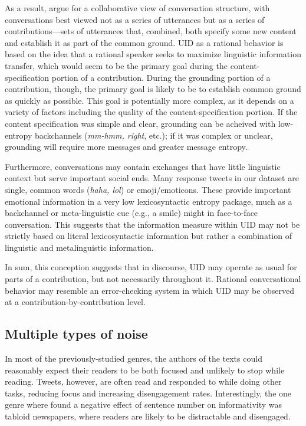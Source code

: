 \documentclass[11pt,letterpaper]{article}
\begin{document}
As a result,  argue for a collaborative view of conversation structure, with conversations best viewed not as a series of utterances but as a series of contributions---sets of utterances that, combined, both specify some new content and establish it as part of the common ground.  UID as a rational behavior is based on the idea that a rational speaker seeks to maximize linguistic  information transfer, which would seem to be the primary goal during the content-specification portion of a contribution.  During the grounding portion of a contribution, though, the primary goal is likely to be to establish common ground as quickly as possible.  This goal is potentially more complex, as it depends on a variety of factors including the quality of the content-specification portion.  If the content specification was simple and clear, grounding can be acheived with low-entropy backchannels ({\it mm-hmm, right}, etc.); if it was complex or unclear, grounding will require more messages and greater message entropy.

Furthermore, conversations may contain exchanges that have little linguistic context but serve important social ends.  Many response tweets in our dataset are single, common words ({\it haha, lol}) or emoji/emoticons.  These provide important emotional information in a very low lexicosyntactic entropy package, much as a backchannel or meta-linguistic cue (e.g., a smile) might in face-to-face conversation.  This suggests that the information measure within UID may not be strictly based on literal lexicosyntactic information but rather a combination of linguistic and metalinguistic information.

In sum, this conception suggests that in discourse, UID may operate as usual for parts of a contribution, but not necessarily throughout it.  Rational conversational behavior may resemble an error-checking system in which UID may be observed at a contribution-by-contribution level.

\subsection{Multiple types of noise}

In most of the previously-studied genres, the authors of the texts could reasonably expect their readers to be both focused and unlikely to stop while reading. Tweets, however, are often read and responded to while doing other tasks, reducing focus and increasing disengagement rates.  Interestingly, the one genre where  found a negative effect of sentence number on informativity was tabloid newspapers, where readers are likely to be distractable and disengaged.
\end{document}

